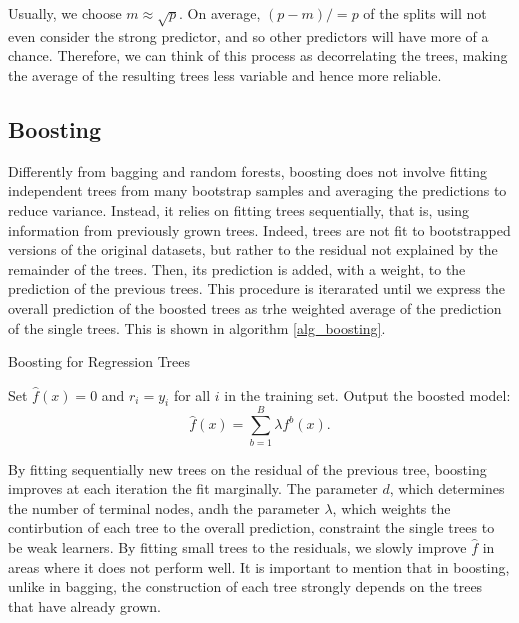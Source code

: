 \documentclass[a4paper,11pt]{article}
\begin{document}
 Usually, we choose $m \approx \sqrt{p}$.
On average, $(p - m)/ = p$ of the splits will not even consider the strong predictor, and so other predictors will have more of a chance. Therefore, we can think of this process as decorrelating the trees, making the average of the resulting trees less variable and hence more reliable.


\subsection{Boosting}

Differently from bagging and random forests, boosting does not involve fitting independent trees from many bootstrap samples and averaging the predictions to reduce variance. Instead, it relies on fitting trees sequentially, that is, using information from previously grown trees. Indeed, trees are not fit to bootstrapped versions of the original datasets, but rather to the residual not explained by the remainder of
the trees. Then, its prediction is added, with a weight, to the prediction of the previous trees. This procedure is iterarated until we express the overall prediction of the boosted trees as trhe weighted average of the prediction of the single trees.
This is shown in algorithm \ref{alg_boosting}. 
\begin{algorithm} [h]
  \caption{Boosting for Regression Trees}
  \label{alg_boosting}
  \SetAlgoLined
  \DontPrintSemicolon
  
  Set $\hat{f}(x) = 0$ and $r_i = y_i$ for all $i$ in the training set.\;
  Output the boosted model:
  \begin{equation}
  \hat{f}(x) = \sum_{b=1}^B \lambda f^b(x).
  \end{equation}\;
  
\end{algorithm}

By fitting sequentially new trees on the residual of the previous tree, boosting improves at each iteration the fit marginally. The parameter $d$, which determines the number of terminal nodes, andh the parameter $\lambda$, which weights the contirbution of each tree to the overall prediction, constraint the single trees to be weak learners. By  fitting small trees to the residuals, we slowly improve $\hat{f}$ in areas where it
does not perform well. It is important to mention that in boosting, unlike in bagging, the construction of each tree strongly depends on the trees that have already grown.
\end{document}

